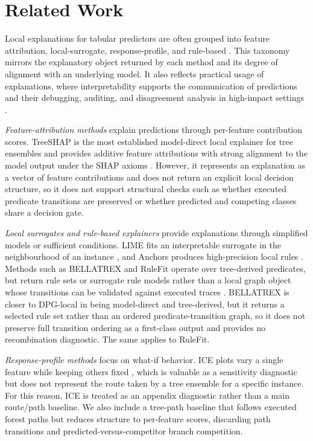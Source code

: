 \documentclass[runningheads]{llncs}
\begin{document}
\section{Related Work}

Local explanations for tabular predictors are often grouped into feature attribution, local-surrogate, response-profile, and rule-based  \cite{poeta2023concept}. This taxonomy mirrors the explanatory object returned by each method and its degree of alignment with an underlying model. It also reflects practical usage of explanations, where interpretability supports the communication of predictions and their debugging, auditing, and disagreement analysis in high-impact settings \cite{doshi2017rigorous,LONGO2024102301}.

\textit{Feature-attribution methods} explain predictions through per-feature contribution scores. TreeSHAP is the most established model-direct local explainer for tree ensembles and provides additive feature attributions with strong alignment to the model output under the SHAP axioms \cite{lundberg2017unified,lundberg2018consistent}. However, it represents an explanation as a vector of feature contributions and does not return an explicit local decision structure, so it does not support structural checks such as whether executed predicate transitions are preserved or whether predicted and competing classes share a decision gate.

\textit{Local surrogates and rule-based explainers} provide explanations through simplified models or sufficient conditions. LIME fits an interpretable surrogate in the neighbourhood of an instance \cite{ribeiro2016why}, and Anchors produces high-precision local rules \cite{ribeiro2018anchors}. Methods such as BELLATREX and RuleFit operate over tree-derived predicates, but return rule sets or surrogate rule models rather than a local graph object whose transitions can be validated against executed traces \cite{dedja2023bellatrex,friedman2008predictive}. BELLATREX is closer to DPG-local in being model-direct and tree-derived, but it returns a selected rule set rather than an ordered predicate-transition graph, so it does not preserve full transition ordering as a first-class output and provides no recombination diagnostic. The same applies to RuleFit.

\textit{Response-profile methods} focus on what-if behavior. ICE plots vary a single feature while keeping others fixed \cite{goldstein2015ice}, which is valuable as a sensitivity diagnostic but does not represent the route taken by a tree ensemble for a specific instance. For this reason, ICE is treated as an appendix diagnostic rather than a main route/path baseline. We also include a tree-path baseline \cite{palczewska2014interpreting} that follows executed forest paths but reduces structure to per-feature scores, discarding path transitions and predicted-versus-competitor branch competition.
\end{document}
